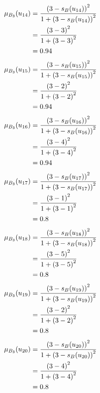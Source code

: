 \documentclass[a4paper]{book}
\begin{document}
				\begin{align}
					\mu_{B_3}(u_{14}) &= \frac{\left(3-s_B(u_{14})\right)^2}{1 + \left(3-s_B(u_{14})\right)^2}\\
					&= \frac{\left(3-3\right)^2}{1 + \left(3-3\right)^2} \notag \\
					&= 0.94 \notag
				\end{align}
				\begin{align}
					\mu_{B_3}(u_{15}) &= \frac{\left(3-s_B(u_{15})\right)^2}{1 + \left(3-s_B(u_{15})\right)^2}\\
					&= \frac{\left(3-2\right)^2}{1 + \left(3-2\right)^2} \notag \\
					&= 0.94 \notag
				\end{align}
				\begin{align}
					\mu_{B_3}(u_{16}) &= \frac{\left(3-s_B(u_{16})\right)^2}{1 + \left(3-s_B(u_{16})\right)^2}\\
					&= \frac{\left(3-4\right)^2}{1 + \left(3-4\right)^2} \notag \\
					&= 0.94 \notag
				\end{align}
				\begin{align}
					\mu_{B_3}(u_{17}) &= \frac{\left(3-s_B(u_{17})\right)^2}{1 + \left(3-s_B(u_{17})\right)^2}\\
					&= \frac{\left(3-1\right)^2}{1 + \left(3-1\right)^2} \notag \\
					&= 0.8 \notag
				\end{align}
				\begin{align}
					\mu_{B_3}(u_{18}) &= \frac{\left(3-s_B(u_{18})\right)^2}{1 + \left(3-s_B(u_{18})\right)^2}\\
					&= \frac{\left(3-5\right)^2}{1 + \left(3-5\right)^2} \notag \\
					&= 0.8 \notag
				\end{align}
				\begin{align}
					\mu_{B_3}(u_{19}) &= \frac{\left(3-s_B(u_{19})\right)^2}{1 + \left(3-s_B(u_{19})\right)^2}\\
					&= \frac{\left(3-2\right)^2}{1 + \left(3-2\right)^2} \notag \\
					&= 0.8 \notag
				\end{align}
				\begin{align}
					\mu_{B_3}(u_{20}) &= \frac{\left(3-s_B(u_{20})\right)^2}{1 + \left(3-s_B(u_{20})\right)^2}\\
					&= \frac{\left(3-4\right)^2}{1 + \left(3-4\right)^2} \notag \\
					&= 0.8 \notag
				\end{align}
\end{document}

